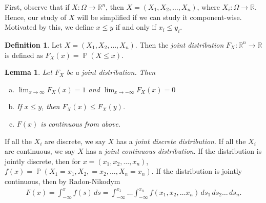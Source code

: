 \documentclass[12pt]{article}
\newcommand{\rr}{\mathbb{R}}
\DeclareMathOperator{\prob}{\mathbb{P}}
\theoremstyle{plain}
\newtheorem{lemma}[theorem]{Lemma}
\theoremstyle{definition}
\newtheorem*{definition}{Definition}
\theoremstyle{remark}
\numberwithin{equation}{section}  %
\begin{document}
First, observe that if ${X}: \Omega \to \rr^n$, then $X = (X_1, X_2,
\ldots, X_n)$, where $X_i: \Omega \to \rr$. Hence, our study of $X$ will be
simplified if we can study it component-wise. Motivated by this, we define
$x \le y$ if and only if $x_i \le y_i$. 
\begin{definition}
	Let ${X} = (X_1, X_2, \ldots, X_n)$. Then the \emph{joint distribution}
	$F_X: \rr^n \to \rr$
	is defined as $F_X(x) = \prob({X} \le x)$.
	\begin{lemma}
		Let $F_X$ be a joint distribution. Then
		\begin{enumerate}[(a)]
			\item
				$\lim_{x \to \infty} F_X(x) = 1$ and $\lim_{x \to -\infty}
				F_X(x) = 0$
			\item
				If $x \le y$, then $F_X(x) \le F_X(y)$.
			\item
				$F(x)$ is continuous from above.
		\end{enumerate}
	\end{lemma}
	If all the $X_i$ are discrete, we say $X$ has a \emph{joint discrete
	distribution}. If all the $X_i$ are continuous, we say $X$ has a 
	\emph{joint continuous distribution}. If the distribution is jointly 
	discrete,
	then for $x = (x_1, x_2, \ldots, x_n)$,
	$f(x) = \prob(X_1 = x_1, X_2, = x_2,
	\ldots, X_n = x_n)$. If the distribution is jointly continuous, then by
	Radon-Nikodym
	\begin{align*}
		F(x) = \int_{-\infty}^x f(s) \, ds = \int_{-\infty}^{x_1} \ldots
		\int_{-\infty}^{x_n} f(x_1, x_2, \ldots x_n) \, ds_1 \, ds_2 \ldots \, 
		ds_n.
	\end{align*}


\end{definition}
\end{document}
